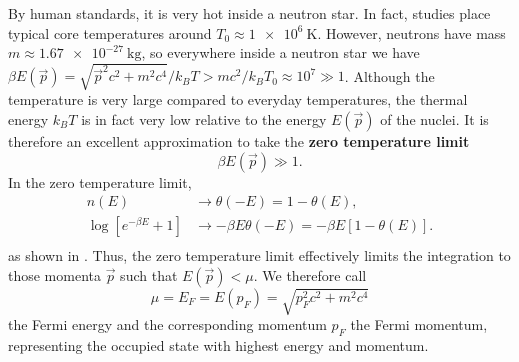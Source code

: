 By human standards, it is very hot inside a neutron star.
In fact, studies place typical core temperatures around $T_0 \approx \SI{1e6}{\kelvin}$.
However, neutrons have mass $m \approx \SI{1.67e-27}{\kilogram}$, so everywhere inside a neutron star we have $\beta E(\vec{p}) = \sqrt{\vec{p}^2 c^2 + m^2 c^4} / k_B T > m c^2 / k_B T_0 \approx 10^7 \gg 1$.
Although the temperature is very large compared to everyday temperatures, the thermal energy $k_B T$ is in fact very low relative to the energy $E(\vec{p})$ of the nuclei.
It is therefore an excellent approximation to take the \textbf{zero temperature limit}
\begin{equation}
	\beta E(\vec{p}) \gg 1 .
\end{equation}
In the zero temperature limit,
\begin{equation}
\begin{split}
	n(E)                                 &\rightarrow \theta(-E) = 1 - \theta(E), \\
	\log \left[ e^{-\beta E} + 1 \right] &\rightarrow -\beta E \theta(-E) = -\beta E [1 - \theta(E)]. \\
\end{split}
\end{equation}
as shown in .
Thus, the zero temperature limit effectively limits the integration to those momenta $\vec{p}$ such that $E(\vec{p}) < \mu$.
We therefore call
\begin{equation}
	\mu = E_F = E(p_F) = \sqrt{p_F^2 c^2 + m^2 c^4}
\end{equation}
the Fermi energy and the corresponding momentum $p_F$ the Fermi momentum, representing the occupied state with highest energy and momentum.

